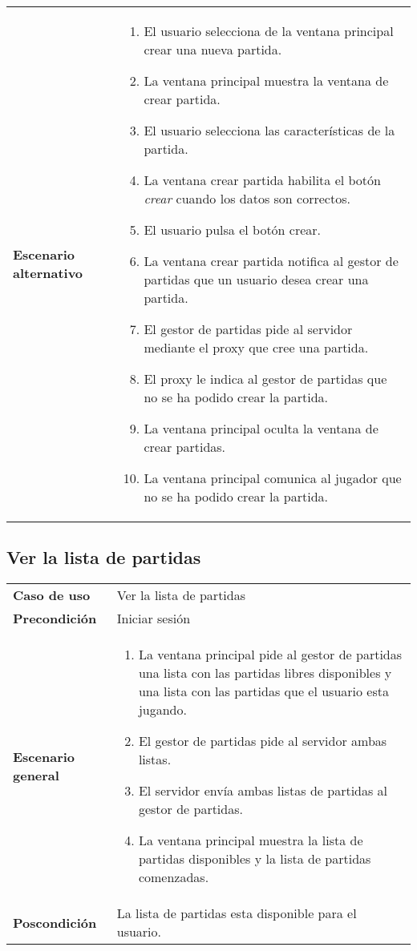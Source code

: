 {\begin{tabularx}{0.95\textwidth}{p{}|X}
\textbf{Escenario alternativo} & \begin{enumerate}
\item El usuario selecciona de la ventana principal crear una nueva partida.
\item La ventana principal muestra la ventana de crear partida.
\item El usuario selecciona las características de la partida.
\item La ventana crear partida habilita el botón \emph{crear} cuando los datos
son correctos.
\item El usuario pulsa el botón crear.
\item La ventana crear partida notifica al gestor de partidas que un usuario
desea crear una partida.
\item El gestor de partidas pide al servidor mediante el proxy que cree una
partida.
\item El proxy le indica al gestor de partidas que no se ha podido crear la
partida.
\item La ventana principal oculta la ventana de crear partidas.
\item La ventana principal comunica al jugador que no se ha podido crear la
partida.
\end{enumerate} \\

\end{tabularx}
}





\subsection{Ver la lista de partidas}

{\footnotesize
\begin{tabularx}{0.95\textwidth}{p{}|X}

\textbf{Caso de uso} & Ver la lista de partidas \\

\textbf{Precondición} & Iniciar sesión \\

\textbf{Escenario general} & \begin{enumerate}
\item La ventana principal pide al gestor de partidas una lista con las
partidas libres disponibles y una lista con las partidas que el usuario esta
jugando.
\item El gestor de partidas pide al servidor ambas listas.
\item El servidor envía ambas listas de partidas al gestor de partidas.
\item La ventana principal muestra la lista de partidas disponibles y la lista
de partidas comenzadas.

\end{enumerate} \\

\textbf{Poscondición} & La lista de partidas esta disponible para el usuario.

\end{tabularx}
}


